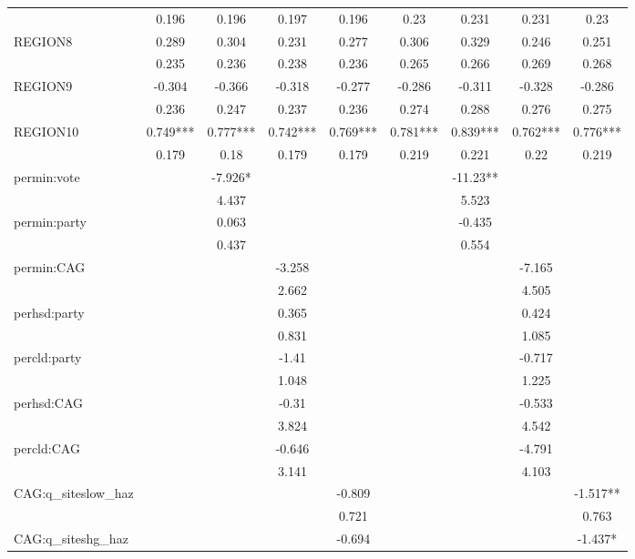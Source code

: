 \documentclass[12pt]{article}
\begin{document}
{\begin{table}[H]
{\begin{tabular}{l|cccc|cccc}
        ~ & 0.196 & 0.196 & 0.197 & 0.196 & 0.23 & 0.231 & 0.231 & 0.23 \\ 
        REGION8 & 0.289 & 0.304 & 0.231 & 0.277 & 0.306 & 0.329 & 0.246 & 0.251 \\ 
        ~ & 0.235 & 0.236 & 0.238 & 0.236 & 0.265 & 0.266 & 0.269 & 0.268 \\ 
        REGION9 & -0.304 & -0.366 & -0.318 & -0.277 & -0.286 & -0.311 & -0.328 & -0.286 \\ 
        ~ & 0.236 & 0.247 & 0.237 & 0.236 & 0.274 & 0.288 & 0.276 & 0.275 \\ 
        REGION10 & 0.749*** & 0.777*** & 0.742*** & 0.769*** & 0.781*** & 0.839*** & 0.762*** & 0.776*** \\ 
        ~ & 0.179 & 0.18 & 0.179 & 0.179 & 0.219 & 0.221 & 0.22 & 0.219 \\ \hline
        permin:vote & ~ & -7.926* & ~ & ~ & ~ & -11.23** & ~ & ~ \\ 
        ~ & ~ & 4.437 & ~ & ~ & ~ & 5.523 & ~ & ~ \\ 
        permin:party & ~ & 0.063 & ~ & ~ & ~ & -0.435 & ~ & ~ \\ 
        ~ & ~ & 0.437 & ~ & ~ & ~ & 0.554 & ~ & ~ \\ \hline
        permin:CAG & ~ & ~ & -3.258 & ~ & ~ & ~ & -7.165 & ~ \\ 
        ~ & ~ & ~ & 2.662 & ~ & ~ & ~ & 4.505 & ~ \\ 
        perhsd:party & ~ & ~ & 0.365 & ~ & ~ & ~ & 0.424 & ~ \\ 
        ~ & ~ & ~ & 0.831 & ~ & ~ & ~ & 1.085 & ~ \\ 
        percld:party & ~ & ~ & -1.41 & ~ & ~ & ~ & -0.717 & ~ \\ 
        ~ & ~ & ~ & 1.048 & ~ & ~ & ~ & 1.225 & ~ \\ 
        perhsd:CAG & ~ & ~ & -0.31 & ~ & ~ & ~ & -0.533 & ~ \\ 
        ~ & ~ & ~ & 3.824 & ~ & ~ & ~ & 4.542 & ~ \\ 
        percld:CAG & ~ & ~ & -0.646 & ~ & ~ & ~ & -4.791 & ~ \\ 
        ~ & ~ & ~ & 3.141 & ~ & ~ & ~ & 4.103 & ~ \\ \hline
        CAG:q\_siteslow\_haz & ~ & ~ & ~ & -0.809 & ~ & ~ & ~ & -1.517** \\ 
        ~ & ~ & ~ & ~ & 0.721 & ~ & ~ & ~ & 0.763 \\ 
        CAG:q\_siteshg\_haz & ~ & ~ & ~ & -0.694 & ~ & ~ & ~ & -1.437* \\ 

\end{tabular}}
\end{table}}
\end{document}
